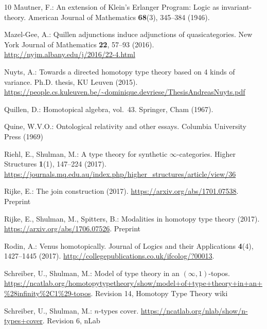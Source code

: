 \documentclass[12pt]{article}
\begin{document}
\begin{thebibliography}{10}
Mautner, F.: An extension of {K}lein's {E}rlanger {P}rogram: Logic as
  invariant-theory.
\newblock American Journal of Mathematics \textbf{68}(3), 345--384 (1946).
\newblock {}

Mazel-Gee, A.: {Quillen} adjunctions induce adjunctions of quasicategories.
\newblock New York Journal of Mathematics \textbf{22}, 57--93 (2016).
\newblock \urlprefix\url{http://nyjm.albany.edu/j/2016/22-4.html}

Nuyts, A.: Towards a directed homotopy type theory based on 4 kinds of
  variance.
\newblock Ph.D. thesis, KU Leuven (2015).
\newblock
  \urlprefix\url{https://people.cs.kuleuven.be/~dominique.devriese/ThesisAndreasNuyts.pdf}

Quillen, D.: Homotopical algebra, vol.~43.
\newblock Springer, Cham (1967).
\newblock {}

Quine, W.V.O.: Ontological relativity and other essays.
\newblock Columbia University Press (1969)

Riehl, E., Shulman, M.: A type theory for synthetic {$\infty$}-categories.
\newblock Higher Structures \textbf{1}(1), 147--224 (2017).
\newblock
  \urlprefix\url{https://journals.mq.edu.au/index.php/higher_structures/article/view/36}

Rijke, E.: The join construction (2017).
\newblock \urlprefix\url{https://arxiv.org/abs/1701.07538}.
\newblock Preprint

Rijke, E., Shulman, M., Spitters, B.: Modalities in homotopy type theory
  (2017).
\newblock \urlprefix\url{https://arxiv.org/abs/1706.07526}.
\newblock Preprint

Rodin, A.: Venus homotopically.
 Journal of Logics and their Applications \textbf{4}(4),
  1427--1445 (2017).
\newblock \urlprefix\url{http://collegepublications.co.uk/ifcolog/?00013}.

Schreiber, U., Shulman, M.: Model of type theory in an {$(\infty,1)$}-topos.
\newblock
  \urlprefix\url{https://ncatlab.org/homotopytypetheory/show/model+of+type+theory+in+an+%28infinity%2C1%29-topos}.
\newblock Revision 14, Homotopy Type Theory wiki

Schreiber, U., Shulman, M.: {$n$}-types cover.
\newblock \urlprefix\url{https://ncatlab.org/nlab/show/n-types+cover}.
\newblock Revision 6, nLab


\end{thebibliography}
\end{document}
